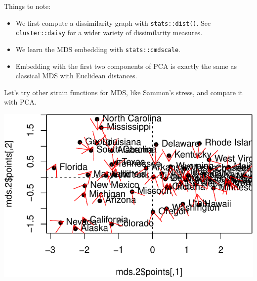 \documentclass[]{book}
\newenvironment{Shaded}{\begin{snugshade}}{\end{snugshade}}
\newcommand{\CommentTok}[1]{\textcolor[rgb]{0.56,0.35,0.01}{\textit{#1}}}
\newcommand{\DataTypeTok}[1]{\textcolor[rgb]{0.13,0.29,0.53}{#1}}
\newcommand{\DecValTok}[1]{\textcolor[rgb]{0.00,0.00,0.81}{#1}}
\newcommand{\FloatTok}[1]{\textcolor[rgb]{0.00,0.00,0.81}{#1}}
\newcommand{\KeywordTok}[1]{\textcolor[rgb]{0.13,0.29,0.53}{\textbf{#1}}}
\newcommand{\NormalTok}[1]{#1}
\newcommand{\OperatorTok}[1]{\textcolor[rgb]{0.81,0.36,0.00}{\textbf{#1}}}
\newcommand{\OtherTok}[1]{\textcolor[rgb]{0.56,0.35,0.01}{#1}}
\newcommand{\StringTok}[1]{\textcolor[rgb]{0.31,0.60,0.02}{#1}}
\providecommand{\tightlist}{%
  \setlength{\itemsep}{0pt}\setlength{\parskip}{0pt}}
\theoremstyle{definition}
\theoremstyle{definition}
\theoremstyle{definition}
\theoremstyle{remark}
\begin{document}
Things to note:

\begin{itemize}
\tightlist
\item
  We first compute a dissimilarity graph with \texttt{stats::dist()}. See \texttt{cluster::daisy} for a wider variety of dissimilarity measures.
\item
  We learn the MDS embedding with \texttt{stats::cmdscale}.
\item
  Embedding with the first two components of PCA is exactly the same as classical MDS with Euclidean distances.
\end{itemize}

Let's try other strain functions for MDS, like Sammon's stress, and compare it with PCA.

\begin{Shaded}
\end{Shaded}

\includegraphics[width=0.5\linewidth]{Rcourse_files/figure-latex/SammonMDS-1}
\end{document}
